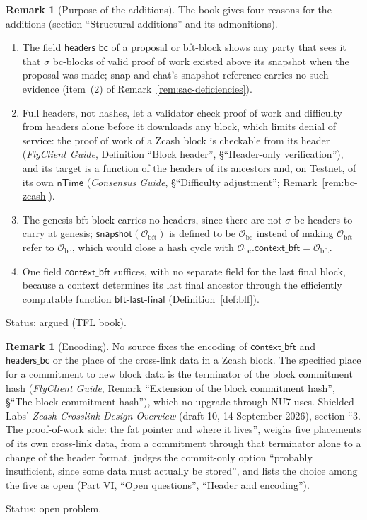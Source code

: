 \documentclass[11pt,a4paper]{article}
\theoremstyle{definition}
\newtheorem{remark}[theorem]{Remark}
\newcommand{\bc}{\mathrm{bc}}
\newcommand{\bft}{\mathrm{bft}}
\newcommand{\Origin}{\mathcal{O}}
\newcommand{\Obc}{\Origin_{\bc}}
\newcommand{\Obft}{\Origin_{\bft}}
\newcommand{\bftlastfinal}{\mathsf{bft\text{-}last\text{-}final}}
\newcommand{\contextbft}{\mathsf{context\_bft}}
\newcommand{\headersbc}{\mathsf{headers\_bc}}
\newcommand{\snapshot}{\mathsf{snapshot}}
\begin{document}
\begin{remark}[Purpose of the additions]\label{rem:struct-purpose}
The book gives four reasons for the additions (section ``Structural
additions'' and its admonitions).
\begin{enumerate}[label=(\alph*)]
\item The field $\headersbc$ of a proposal or bft-block shows any party that
  sees it that $\sigma$ bc-blocks of valid proof of work existed above its
  snapshot when the proposal was made; snap-and-chat's snapshot reference
  carries no such evidence (item~(2) of Remark~\ref{rem:sac-deficiencies}).
\item Full headers, not hashes, let a validator check proof of work and
  difficulty from headers alone before it downloads any block, which limits
  denial of service: the proof of work of a Zcash block is checkable from its
  header (\emph{FlyClient Guide}, Definition ``Block header'',
  \S``Header-only verification''), and its target is a function of the
  headers of its ancestors and, on Testnet, of its own $\mathsf{nTime}$
  (\emph{Consensus Guide}, \S``Difficulty adjustment'';
  Remark~\ref{rem:bc-zcash}).
\item The genesis bft-block carries no headers, since there are not $\sigma$
  bc-headers to carry at genesis; $\snapshot(\Obft)$ is defined to be $\Obc$
  instead of making $\Obft$ refer to $\Obc$, which would close a hash cycle
  with $\Obc.\contextbft = \Obft$.
\item One field $\contextbft$ suffices, with no separate field for the last
  final block, because a context determines its last final ancestor through
  the efficiently computable function $\bftlastfinal$
  (Definition~\ref{def:blf}).
\end{enumerate}

Status: argued (TFL book).
\end{remark}

\begin{remark}[Encoding]\label{rem:encoding}
No source fixes the encoding of $\contextbft$ and $\headersbc$ or the place of
the cross-link data in a Zcash block. The specified
place for a commitment to new block data is the terminator of the block
commitment hash (\emph{FlyClient Guide}, Remark ``Extension of the block
commitment hash'', \S``The block commitment hash''), which no upgrade through
NU7 uses. Shielded Labs' \emph{Zcash Crosslink Design Overview} (draft 10,
14 September 2026), section ``3. The proof-of-work side: the fat pointer and
where it lives'', weighs five placements of its own cross-link data, from a
commitment through that terminator alone to a change of the header format,
judges the commit-only option ``probably insufficient, since some data must
actually be stored'', and lists the choice among the five as open (Part VI,
``Open questions'', ``Header and encoding'').

Status: open problem.
\end{remark}
\end{document}
